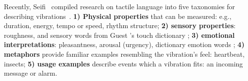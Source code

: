 %
%
%
%
%
%
Recently, Seifi \etal\ compiled research on tactile language into five taxonomies for describing vibrations~\cite{Seifi2015}.  \textbf{1) Physical properties} that can be measured: e.g., duration, energy, tempo or speed, rhythm structure; 
\textbf{2) sensory properties}: roughness, and sensory words from  Guest \etal's touch dictionary \cite{Guest2011};
\textbf{3) emotional interpretations}: pleasantness, arousal (urgency), dictionary emotion words \cite{Guest2011};
\textbf{4) metaphors} provide familiar examples resembling the vibration's feel: heartbeat, insects;
\textbf{5) usage examples} describe %
events which a vibration fits: an incoming message or alarm.

